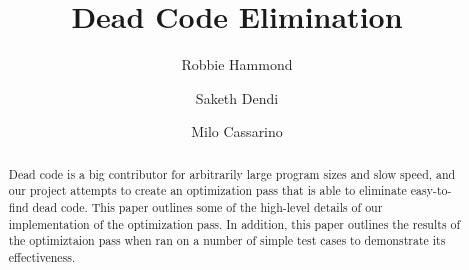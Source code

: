\documentclass[sigconf]{acmart}
\begin{document}
\title{Dead Code Elimination}

\author{Robbie Hammond}

\author{Saketh Dendi}

\author{Milo Cassarino}
\renewcommand{\shortauthors}{Dendi, Hammond and Cassarino, et al.}

\begin{abstract}
Dead code is a big contributor for arbitrarily large 
program sizes and slow speed, and our project attempts 
to create an optimization pass that is able to eliminate 
easy-to-find dead code. This paper outlines some of the 
high-level details of our implementation of the optimization pass. 
In addition, this paper outlines the results of the optimiztaion 
pass when ran on a number of simple test cases to demonstrate 
its effectiveness. 
\end{abstract}



\end{document}
